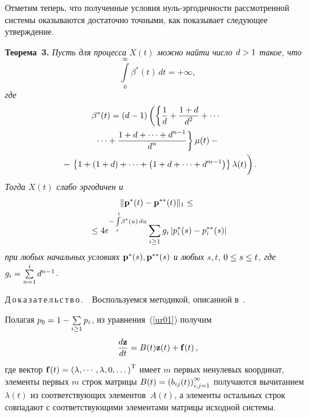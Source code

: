 \begin{multicols}{2}
\smallskip

Отметим теперь, что полученные условия нуль-эр\-го\-дич\-ности рас\-смот\-рен\-ной сис\-те\-мы 
оказываются достаточно точными, как показывает следующее утверждение.


\medskip

\noindent
\textbf{Теорема~3.}
\textit{Пусть для процесса $X\left( t\right) $ можно найти число  $d\hm > 1$ такое, что
\begin{equation}
 \int\limits_{0}^{\infty} \beta^*(t) \, dt = + \infty,
\label{3011}
\end{equation}
где}
\begin{multline*}
\beta^*(t) =  \left( d-1\right)\left(\left\{\fr{1}{d} + \fr{1+d}{d^2} + 
\cdots{}\right.\right.\\
\left.{}\cdots +\fr{1+d+\dots+d^{n-1}}{d^n}\right\}\mu(t) -{} \\ 
{} - \left. \left\{1 + \left(1+d\right)+\dots+\left(1+d+\dots+d^{m-1}\right)\right\}\la(t) 
\vphantom{\fr{1}{d^2}}\right).\hspace*{-4.43994pt}
\end{multline*}
\textit{Тогда  $X\left( t\right) $ слабо эргодичен и}
\begin{multline}
\|{\mathbf p}^*(t)-{\mathbf p}^{**}(t)\|_{1} \le{}\\
{}\le 4 e^{-\int\limits_s^t \!{\beta^*(u)\,du}}
\sum\limits_{i \ge 1} g_i\left|p_i^*(s)-p_i^{**}(s)\right|\hspace*{-0.34201pt}
 \label{3012'}
\end{multline}
\textit{при любых начальных условиях ${\bf p^*}(s), {\bf p^{**}}(s)$ и любых $s,t$, 
$0\hm\le s\hm\le t$, где $g_i\hm=\sum\limits_{n=1}^{i}d^{n-1}$.}


\smallskip

\noindent
Д\,о\,к\,а\,з\,а\,т\,е\,л\,ь\,с\,т\,в\,о\,.\ \
Воспользуемся методикой, описанной в~\cite{z11,z12}.

Полагая $p_0\hm=1-\sum\limits_{i \ge 1}{p_i}$,  из уравнения~(\ref{ur01}) получим
\begin{equation}
\displaystyle\frac{\displaystyle d{\mathbf z}\mathstrut}{\displaystyle dt\mathstrut}= B(t){\mathbf z}(t)+{\mathbf f}(t)\,, 
\label{3021}
\end{equation}
где вектор ${\mathbf f}(t)=\left(\lambda, \cdots, \lambda, 0,\dots \right)^{\mathrm{T}}$ имеет $m$ 
первых ненулевых координат, элементы первых $m$ строк матрицы 
$B(t)\hm=\left(b_{ij}(t)\right)_{i,j=1}^{\infty}$ получаются вычитанием $\lambda(t)$ из 
соответствующих элементов~$A(t)$, а элементы остальных строк совпадают с со\-от\-вет\-ст\-ву\-ющи\-ми 
элементами матрицы исходной сис\-темы.
{

}
\end{multicols}
